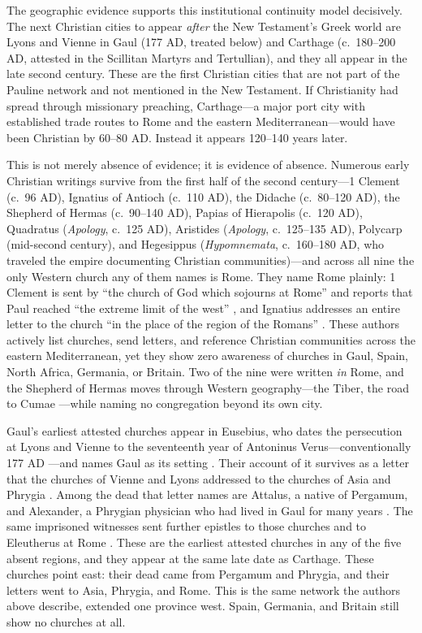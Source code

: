 The geographic evidence supports this institutional continuity model decisively.
The next Christian cities to appear \emph{after} the New Testament's Greek world are Lyons and Vienne in Gaul (177 AD, treated below) and Carthage (c.~180--200 AD, attested in the Scillitan Martyrs and Tertullian), and they all appear in the late second century.
These are the first Christian cities that are not part of the Pauline network and not mentioned in the New Testament.
If Christianity had spread through missionary preaching, Carthage---a major port city with established trade routes to Rome and the eastern Mediterranean---would have been Christian by 60--80 AD.
Instead it appears 120--140 years later.

This is not merely absence of evidence; it is evidence of absence.
Numerous early Christian writings survive from the first half of the second century---1 Clement \cite{clement:firstclement} (c.~96 AD), Ignatius of Antioch \cite{ignatius:letters} (c.~110 AD), the Didache \cite{didache} (c.~80--120 AD), the Shepherd of Hermas \cite{shepherd:hermas} (c.~90--140 AD), Papias of Hierapolis (c.~120 AD), Quadratus (\emph{Apology}, c.~125 AD), Aristides (\emph{Apology}, c.~125--135 AD), Polycarp \cite{polycarp:philippians} (mid-second century), and Hegesippus (\emph{Hypomnemata}, c.~160--180 AD, who traveled the empire documenting Christian communities)---and across all nine the only Western church any of them names is Rome.
They name Rome plainly: 1 Clement is sent by ``the church of God which sojourns at Rome'' and reports that Paul reached ``the extreme limit of the west'' \cite[1, 5]{clement:firstclement}, and Ignatius addresses an entire letter to the church ``in the place of the region of the Romans'' \cite{ignatius:letters}.
These authors actively list churches, send letters, and reference Christian communities across the eastern Mediterranean, yet they show zero awareness of churches in Gaul, Spain, North Africa, Germania, or Britain.
Two of the nine were written \emph{in} Rome, and the Shepherd of Hermas moves through Western geography---the Tiber, the road to Cumae \cite{shepherd:hermas}---while naming no congregation beyond its own city.

Gaul's earliest attested churches appear in Eusebius, who dates the persecution at Lyons and Vienne to the seventeenth year of Antoninus Verus---conventionally 177 AD \cite[Book 5, Introduction 1]{eusebius:he}---and names Gaul as its setting \cite[5.1.1]{eusebius:he}.
Their account of it survives as a letter that the churches of Vienne and Lyons addressed to the churches of Asia and Phrygia \cite[5.1.2--3]{eusebius:he}.
Among the dead that letter names are Attalus, a native of Pergamum, and Alexander, a Phrygian physician who had lived in Gaul for many years \cite[5.1.17, 5.1.49]{eusebius:he}.
The same imprisoned witnesses sent further epistles to those churches and to Eleutherus at Rome \cite[5.3.4]{eusebius:he}.
These are the earliest attested churches in any of the five absent regions, and they appear at the same late date as Carthage.
These churches point east: their dead came from Pergamum and Phrygia, and their letters went to Asia, Phrygia, and Rome.
This is the same network the authors above describe, extended one province west.
Spain, Germania, and Britain still show no churches at all.

